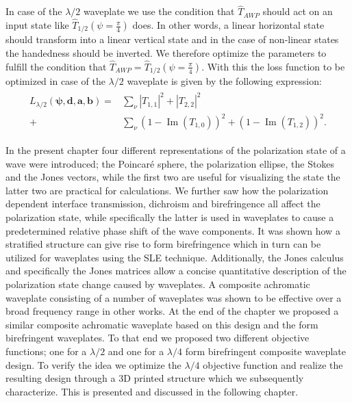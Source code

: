 In case of the $\lambda/2$ waveplate we use the condition that $\hat{T}_{AWP}$ should act on an input state like $\hat{T}_{1/2}(\psi=\frac{\pi}{4})$ does. In other words, a linear horizontal state should transform into a linear vertical state and in the case of non-linear states the handedness should be inverted. We therefore optimize the parameters to fulfill the condition that $\hat{T}_{AWP}=\hat{T}_{1/2}(\psi=\frac{\pi}{4})$. With this the loss function to be optimized in case of the $\lambda/2$ waveplate is given by the following expression:
\begin{align}
\begin{split}
    L_{\lambda/2}(\bm{\psi}, \bm{d}, \bm{a}, \bm{b})=
    &\sum_{\nu}|T_{1,1}|^2+|T_{2,2}|^2\\
    +&\sum_{\nu}(1 - \operatorname{Im}(T_{1,0}))^2+
    (1 - \operatorname{Im}(T_{1,2}))^2.
\end{split}
\end{align}

In the present chapter four different representations of the polarization state of a wave were introduced; the Poincaré sphere, the polarization ellipse, the Stokes and the Jones vectors, while the first two are useful for visualizing the state the latter two are practical for calculations. We further saw how the polarization dependent interface transmission, dichroism and birefringence all affect the polarization state, while specifically the latter is used in waveplates to cause a predetermined relative phase shift of the wave components. It was shown how a stratified structure can give rise to form birefringence which in turn can be utilized for waveplates using the SLE technique. Additionally, the Jones calculus and specifically the Jones matrices allow a concise quantitative description of the polarization state change caused by waveplates. A composite achromatic waveplate consisting of a number of waveplates was shown to be effective over a broad frequency range in other works. At the end of the chapter we proposed a similar composite achromatic waveplate based on this design and the form birefringent waveplates. To that end we proposed two different objective functions; one for a $\lambda/2$ and one for a $\lambda/4$ form birefringent composite waveplate design. To verify the idea we optimize the $\lambda/4$ objective function and realize the resulting design through a 3D printed structure which we subsequently characterize. This is presented and discussed in the following chapter.


